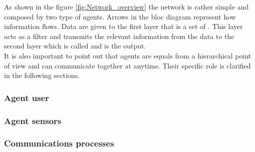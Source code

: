 As shown in the figure \ref{fig:Network_overview} the network is rather simple and composed by two type of agents. Arrows in the bloc diagram represent how information flows. Data are given to the first layer that is a set of . This layer acts as a filter and transmits the relevant information from the data to the second layer which is called  and is the output.\\

It is also important to point out that agents are equals from a hierarchical point of view and can communicate together at anytime. Their specific role is clarified in the following sections.



\subsubsection{Agent user}


\subsubsection{Agent sensors}


\subsubsection{Communications processes}
